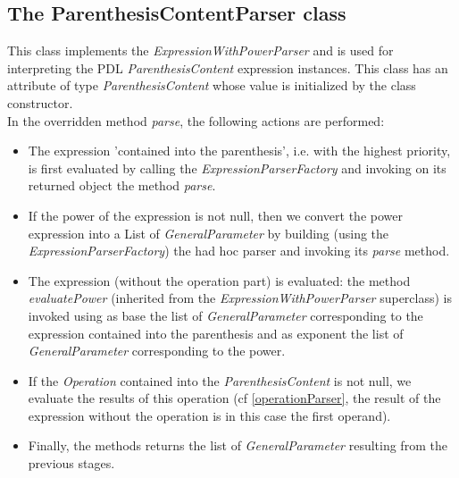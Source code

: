 \documentclass[a4paper,11pt] {ivoa}
\begin{document}
\subsection{The ParenthesisContentParser class}
This class implements the {\it ExpressionWithPowerParser} and is used for interpreting the PDL {\it  ParenthesisContent} expression instances. This class has an attribute of type {\it ParenthesisContent} whose value is initialized by the class constructor.\\
In the overridden method {\it parse}, the following actions are performed:
\begin{itemize}
\item The expression 'contained into the parenthesis', i.e. with the highest priority, is first evaluated by calling the {\it ExpressionParserFactory} and invoking on its returned object the method {\it parse}.
\item  If the power of the expression is not null, then we convert the power expression into a List of {\it GeneralParameter} by building (using the {\it ExpressionParserFactory}) the had hoc parser and invoking its {\it parse} method.
\item The expression (without the operation part) is evaluated:  the method {\it evaluatePower} (inherited from the {\it ExpressionWithPowerParser} superclass) is invoked using as base the list of {\it GeneralParameter} corresponding to the expression contained into the parenthesis and as exponent the list of {\it GeneralParameter} corresponding to the power.
\item  If the {\it Operation} contained into the {\it ParenthesisContent}  is not null, we evaluate the results of this operation (cf \ref{operationParser}, the result of the expression without the operation is in this case the first operand).
\item Finally, the methods returns the list of {\it GeneralParameter} resulting from the previous stages.
\end{itemize}
\end{document}
